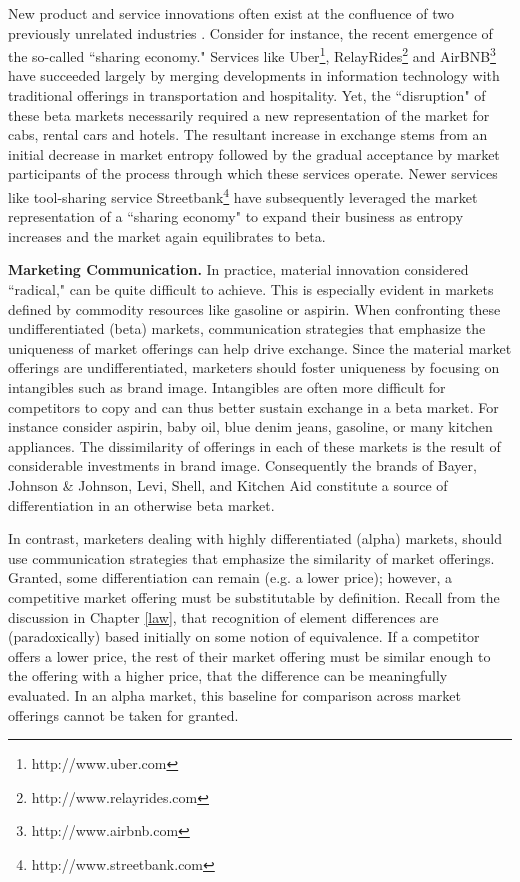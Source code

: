 New product and service innovations often exist at the confluence of two previously unrelated industries \citep{arthur2009}. Consider for instance, the recent emergence of the so-called ``sharing economy." Services like Uber\footnote{http://www.uber.com}, RelayRides\footnote{http://www.relayrides.com} and AirBNB\footnote{http://www.airbnb.com}  have succeeded largely by merging developments in information technology with traditional offerings in transportation and hospitality. Yet, the ``disruption" of these beta markets necessarily required a new representation of the market for cabs, rental cars and hotels. The resultant increase in exchange stems from an initial decrease in market entropy followed by the gradual acceptance by market participants of the process through which these services operate. Newer services like tool-sharing service Streetbank\footnote{http://www.streetbank.com} have subsequently leveraged the market representation of a ``sharing economy" to expand their business as entropy increases and the market again equilibrates to beta. 

\textbf{Marketing Communication.}
In practice, material innovation considered ``radical," can be quite difficult to achieve. This is especially evident in markets defined by commodity resources like gasoline or aspirin.  When confronting these undifferentiated (beta) markets, communication strategies that emphasize the uniqueness of market offerings can help drive exchange. Since the material market offerings are undifferentiated, marketers should foster uniqueness by focusing on intangibles such as brand image. Intangibles are often more difficult for competitors to copy \citep{teece1986} and can thus better sustain exchange in a beta market. For instance consider aspirin, baby oil, blue denim jeans, gasoline, or many kitchen appliances. The dissimilarity of offerings in each of these markets is the result of considerable investments in brand image. Consequently the brands of Bayer, Johnson \& Johnson, Levi, Shell, and Kitchen Aid constitute a source of differentiation in an otherwise beta market. 

In contrast, marketers dealing with highly differentiated (alpha) markets, should use communication strategies that emphasize the similarity of market offerings. Granted, some differentiation can remain (e.g. a lower price); however, a competitive market offering must be substitutable by definition. Recall from the discussion in Chapter \ref{law}, that recognition of element differences are (paradoxically) based initially on some notion of equivalence. If a competitor offers a lower price, the rest of their market offering must be similar enough to the offering with a higher price, that the difference can be meaningfully evaluated. In an alpha market, this baseline for comparison across market offerings cannot be taken for granted.

